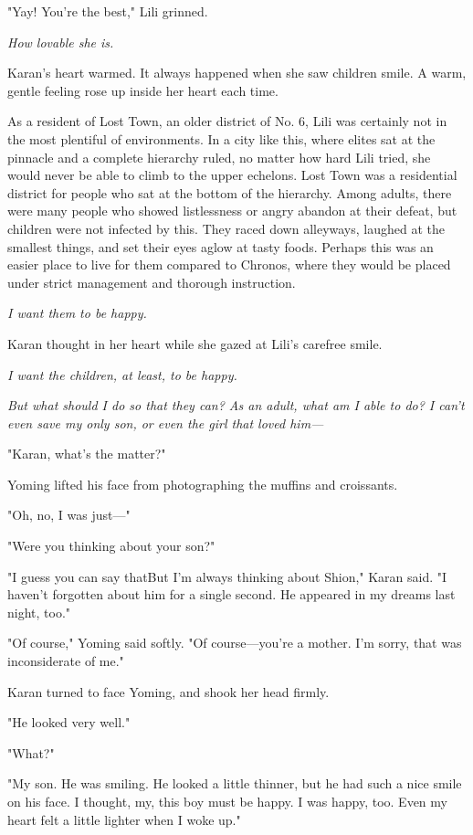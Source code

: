 "Yay! You're the best," Lili grinned.

\emph{How lovable she is.}

Karan's heart warmed. It always happened when she saw children smile. A
warm, gentle feeling rose up inside her heart each time.

As a resident of Lost Town, an older district of No. 6, Lili was
certainly not in the most plentiful of environments. In a city like
this, where elites sat at the pinnacle and a complete hierarchy ruled,
no matter how hard Lili tried, she would never be able to climb to the
upper echelons. Lost Town was a residential district for people who sat
at the bottom of the hierarchy. Among adults, there were many people who
showed listlessness or angry abandon at their defeat, but children were
not infected by this. They raced down alleyways, laughed at the smallest
things, and set their eyes aglow at tasty foods. Perhaps this was an
easier place to live for them compared to Chronos, where they would be
placed under strict management and thorough instruction.

\emph{I want them to be happy.}

Karan thought in her heart while she gazed at Lili's carefree smile.

\emph{I want the children, at least, to be happy.}

\emph{But what should I do so that they can? As an adult, what am I able to
do? I can't even save my only son, or even the girl that loved him---}

"Karan, what's the matter?"

Yoming lifted his face from photographing the muffins and croissants.

"Oh, no, I was just---"

"Were you thinking about your son?"

"I guess you can say that\el But I'm always thinking about Shion," Karan
said. "I haven't forgotten about him for a single second. He appeared in
my dreams last night, too."

"Of course," Yoming said softly. "Of course---you're a mother. I'm sorry,
that was inconsiderate of me."

Karan turned to face Yoming, and shook her head firmly.

"He looked very well."

"What?"

"My son. He was smiling. He looked a little thinner, but he had such a
nice smile on his face. I thought, my, this boy must be happy. I was
happy, too. Even my heart felt a little lighter when I woke up."

